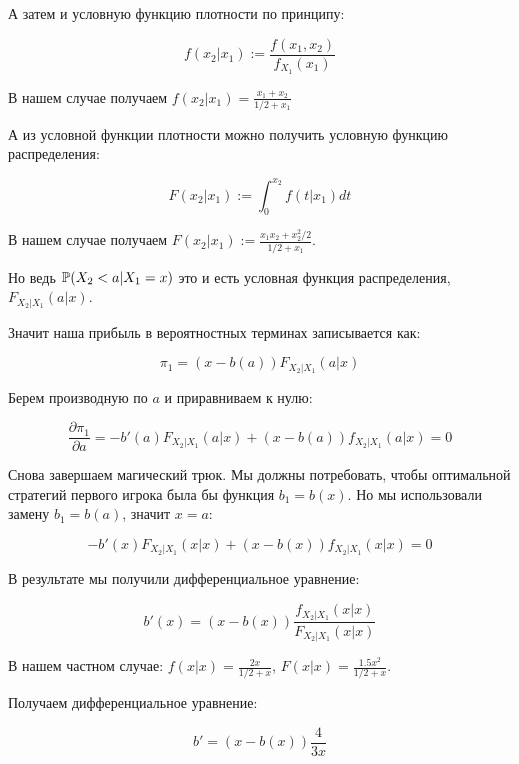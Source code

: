 \begin{enumerate}
А затем и условную функцию плотности по принципу:

\begin{equation}
f(x_{2}|x_{1}):=\frac{f(x_{1},x_{2})}{f_{X_{1}}(x_{1})}
\end{equation}

В нашем случае получаем $ f(x_{2}|x_{1})=\frac{x_{1}+x_{2}}{1/2+x_{1}} $

А из условной функции плотности можно получить условную функцию распределения:

\begin{equation}
F(x_{2}|x_{1}):=\int_{0}^{x_{2}} f(t|x_{1}) dt
\end{equation}

В нашем случае получаем $F(x_{2}|x_{1}):=\frac{x_{1}x_{2}+x_{2}^{2}/2}{1/2+x_{1}}$.

Но ведь $ \P(X_{2}<a|X_{1}=x) $ это и есть условная функция распределения, $ F_{X_{2}|X_{1}}(a|x) $.

Значит наша прибыль в вероятностных терминах записывается как:

\begin{equation}
\pi_{1}=(x-b(a)) F_{X_{2}|X_{1}}(a|x)
\end{equation}

Берем производную по $ a $ и приравниваем к нулю:

\begin{equation}
\frac{\partial \pi_{1}}{\partial a}=-b'(a) F_{X_{2}|X_{1}}(a|x)+(x-b(a))f_{X_{2}|X_{1}}(a|x)=0
\end{equation}

Снова завершаем магический трюк. Мы должны потребовать, чтобы оптимальной стратегий первого игрока была бы функция $b_{1}=b(x)  $. Но мы использовали замену $ b_{1}=b(a) $, значит $ x=a $:


\begin{equation}
-b'(x) F_{X_{2}|X_{1}}(x|x)+(x-b(x))f_{X_{2}|X_{1}}(x|x)=0
\end{equation}

В результате мы получили дифференциальное уравнение:

\begin{equation}
b'(x)=(x-b(x))\frac{f_{X_{2}|X_{1}}(x|x)}{F_{X_{2}|X_{1}}(x|x)}
\end{equation}

В нашем частном случае: $ f(x|x)=\frac{2x}{1/2+x} $, $ F(x|x)=\frac{1.5x^2}{1/2+x} $.

Получаем дифференциальное уравнение:

\begin{equation}
b'=(x-b(x))\frac{4}{3x}
\end{equation}


\end{enumerate}
